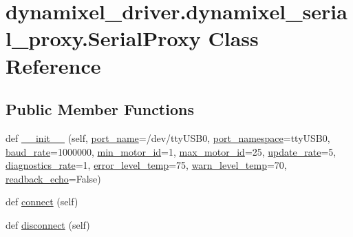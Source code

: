 \hypertarget{classdynamixel__driver_1_1dynamixel__serial__proxy_1_1_serial_proxy}{}\section{dynamixel\+\_\+driver.\+dynamixel\+\_\+serial\+\_\+proxy.\+Serial\+Proxy Class Reference}
\label{classdynamixel__driver_1_1dynamixel__serial__proxy_1_1_serial_proxy}
\subsection*{Public Member Functions}
\begin{DoxyCompactItemize}
\item 
def \hyperlink{classdynamixel__driver_1_1dynamixel__serial__proxy_1_1_serial_proxy_a903847536e561977c91725b98ceec1ee}{\+\_\+\+\_\+init\+\_\+\+\_\+} (self, \hyperlink{classdynamixel__driver_1_1dynamixel__serial__proxy_1_1_serial_proxy_a2eadaf65e5a95f904e33ad040e93f5e1}{port\+\_\+name}=\textquotesingle{}/dev/tty\+U\+S\+B0\textquotesingle{}, \hyperlink{classdynamixel__driver_1_1dynamixel__serial__proxy_1_1_serial_proxy_ad40092bd0829d52f189f392d6ba5c228}{port\+\_\+namespace}=\textquotesingle{}tty\+U\+S\+B0\textquotesingle{}, \hyperlink{classdynamixel__driver_1_1dynamixel__serial__proxy_1_1_serial_proxy_a793768f34294781d007b11e6943b9af3}{baud\+\_\+rate}=\textquotesingle{}1000000\textquotesingle{}, \hyperlink{classdynamixel__driver_1_1dynamixel__serial__proxy_1_1_serial_proxy_a6d99b742c6f2026618602800645ec536}{min\+\_\+motor\+\_\+id}=1, \hyperlink{classdynamixel__driver_1_1dynamixel__serial__proxy_1_1_serial_proxy_a9c753312acaaa1d919cb9bdb9c6a010c}{max\+\_\+motor\+\_\+id}=25, \hyperlink{classdynamixel__driver_1_1dynamixel__serial__proxy_1_1_serial_proxy_aaec6969aebe67465cb42bb2b668d7272}{update\+\_\+rate}=5, \hyperlink{classdynamixel__driver_1_1dynamixel__serial__proxy_1_1_serial_proxy_a534a5684883bdd96a71de4a0037b65e5}{diagnostics\+\_\+rate}=1, \hyperlink{classdynamixel__driver_1_1dynamixel__serial__proxy_1_1_serial_proxy_ac1c00612edbb0b170d887494d5be92cb}{error\+\_\+level\+\_\+temp}=75, \hyperlink{classdynamixel__driver_1_1dynamixel__serial__proxy_1_1_serial_proxy_a1bd026c25af7682998bdfcf957c7dd2d}{warn\+\_\+level\+\_\+temp}=70, \hyperlink{classdynamixel__driver_1_1dynamixel__serial__proxy_1_1_serial_proxy_a8a19e1c9d41cc65a4096a549fe749896}{readback\+\_\+echo}=False)
\item 
def \hyperlink{classdynamixel__driver_1_1dynamixel__serial__proxy_1_1_serial_proxy_ac1fd932b790d5188a3f689886838ed5c}{connect} (self)
\item 
def \hyperlink{classdynamixel__driver_1_1dynamixel__serial__proxy_1_1_serial_proxy_a1fd367226e850fe5cd59f901e57ba7de}{disconnect} (self)
\end{DoxyCompactItemize}
